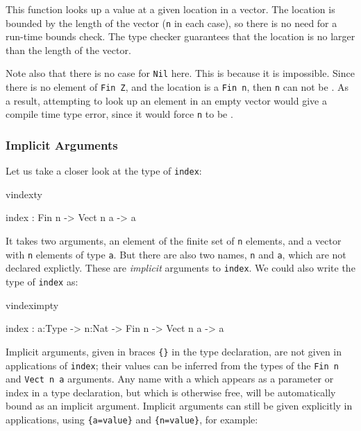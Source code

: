 \noindent
This function looks up a value at a given location in a vector. The location is
bounded by the length of the vector (\texttt{n} in each case), so there is no
need for a run-time bounds check. The type checker guarantees that the location
is no larger than the length of the vector.

Note also that there is no case for \texttt{Nil} here. This is because it is
impossible. Since there is no element of \texttt{Fin Z}, and the location is a
\texttt{Fin n}, then \texttt{n} can not be .  As a result, attempting to
look up an element in an empty vector would give a compile time type error,
since it would force \texttt{n} to be .

\subsubsection{Implicit Arguments}

Let us take a closer look at the type of \texttt{index}:

\begin{SaveVerbatim}{vindexty}

index : Fin n -> Vect n a -> a

\end{SaveVerbatim}

\noindent
It takes two arguments, an element of the finite set of \texttt{n} elements, and a vector
with \texttt{n} elements of type \texttt{a}. But there are also two names, 
\texttt{n} and \texttt{a}, which are not declared explictly. These are \emph{implicit}
arguments to \texttt{index}. We could also write the type of \texttt{index} as:

\begin{SaveVerbatim}{vindeximpty}

index : {a:Type} -> {n:Nat} -> Fin n -> Vect n a -> a

\end{SaveVerbatim}

\noindent
Implicit arguments, given in braces \texttt{\{\}} in the type declaration, are
not given in applications of \texttt{index}; their values can be inferred from
the types of the \texttt{Fin n} and \texttt{Vect n a} arguments. Any name 
with a  which
appears as a parameter or index in a type declaration, but which is otherwise
free, will be automatically bound as an implicit argument.  Implicit arguments
can still be given explicitly in applications, using \texttt{\{a=value\}} and
\texttt{\{n=value\}}, for example:


